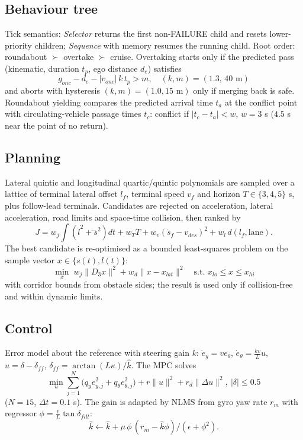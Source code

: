\documentclass[conference]{IEEEtran}
\begin{document}
\subsection{Behaviour tree}
Tick semantics: \emph{Selector} returns the first non-FAILURE child and resets lower-priority children; \emph{Sequence} with memory resumes the running child. Root order: roundabout $\succ$ overtake $\succ$ cruise. Overtaking starts only if the predicted pass (kinematic, duration $t_p$, ego distance $d_e$) satisfies
\begin{equation}g_{onc}-d_e-|v_{onc}|\,k\,t_p>m,\quad (k,m)=(1.3,\,40\text{ m})\end{equation}
and aborts with hysteresis $(k,m)=(1.0,15\text{ m})$ only if merging back is safe. Roundabout yielding compares the predicted arrival time $t_a$ at the conflict point with circulating-vehicle passage times $t_c$: conflict if $|t_c-t_a|<w$, $w=3$ s ($4.5$ s near the point of no return).

\subsection{Planning}
Lateral quintic and longitudinal quartic/quintic polynomials are sampled over a lattice of terminal lateral offset $l_f$, terminal speed $v_f$ and horizon $T\in\{3,4,5\}$ s, plus follow-lead terminals. Candidates are rejected on acceleration, lateral acceleration, road limits and space-time collision, then ranked by
\begin{equation}J=w_j\!\int(\dddot l^2+\dddot s^2)dt+w_T T+w_v(\dot s_f-v_{des})^2+w_l\,d(l_f,\text{lane}).\end{equation}
The best candidate is re-optimised as a bounded least-squares problem on the sample vector $x\in\{s(t),l(t)\}$:
\begin{equation}\min_x\; w_j\|D_3x\|^2+w_d\|x-x_{lat}\|^2\quad\text{s.t. } x_{lo}\le x\le x_{hi}\end{equation}
with corridor bounds from obstacle sides; the result is used only if collision-free and within dynamic limits.

\subsection{Control}
Error model about the reference with steering gain $k$: $\dot e_y=v e_\theta$, $\dot e_\theta=\tfrac{kv}{L}u$, $u=\delta-\delta_{ff}$, $\delta_{ff}=\arctan(L\kappa)/\hat k$. The MPC solves
\begin{equation}\min_u\sum_{j=1}^{N}\big(q_ye_{y,j}^2+q_\theta e_{\theta,j}^2\big)+r\|u\|^2+r_d\|\Delta u\|^2,\ |\delta|\le0.5\end{equation}
($N=15$, $\Delta t=0.1$ s). The gain is adapted by NLMS from gyro yaw rate $r_m$ with regressor $\phi=\tfrac vL\tan\delta_{filt}$:
\begin{equation}\hat k\leftarrow\hat k+\mu\,\phi\,(r_m-\hat k\phi)/(\epsilon+\phi^2).\end{equation}
\end{document}
